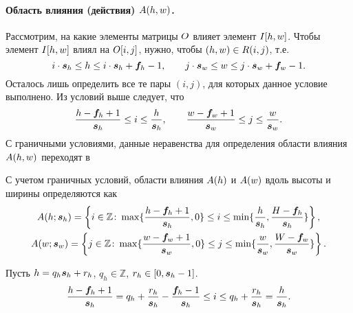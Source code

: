 \documentclass{report}
\numberwithin{theorem}{chapter}
\numberwithin{statement}{chapter}
\numberwithin{lemma}{chapter}
\theoremstyle{definition}
\numberwithin{task}{chapter}
\theoremstyle{remark}
\numberwithin{example}{chapter}
\theoremstyle{definition}
\numberwithin{definition}{chapter}
\theoremstyle{remark}
\theoremstyle{remark}
\numberwithin{lyrics}{section}
\begin{document}
\paragraph{Область влияния (действия) $A(h, w)$.}
Рассмотрим, на какие элементы матрицы $O$ влияет элемент $I[h, w]$. Чтобы элемент $I[h, w]$ влиял на $O[i, j]$, нужно, чтобы $(h, w) \in R(i, j)$, т.е.
\begin{equation}
i \cdot \boldsymbol{s}_h \le h \le i \cdot \boldsymbol{s}_h + \boldsymbol{f}_h - 1, \qquad j \cdot \boldsymbol{s}_w \le w \le j \cdot \boldsymbol{s}_w + \boldsymbol{f}_w - 1.
\end{equation}
Осталось лишь определить все те пары $(i, j)$, для которых данное условие выполнено. 
Из условий выше следует, что
\begin{equation}
\frac{h - \boldsymbol{f}_h + 1}{\boldsymbol{s}_h} \le i \le \frac{h}{\boldsymbol{s}_h}, \qquad \frac{w - \boldsymbol{f}_w + 1}{\boldsymbol{s}_w} \le j \le \frac{w}{\boldsymbol{s}_w}. 
\end{equation}
С граничными условиями, данные неравенства для определения области влияния $A(h, w)$ переходят в

С учетом граничных условий, области влияния $A(h)$ и $A(w)$ вдоль высоты и ширины определяются как
\begin{gather*}
A(h; \boldsymbol{s}_h) = \left\{i \in \mathbb{Z} \colon \max\{\frac{h - \boldsymbol{f}_h + 1}{\boldsymbol{s}_h}, 0\} \le i \le \min\{\frac{h}{\boldsymbol{s}_h}, \frac{H - \boldsymbol{f}_h}{\boldsymbol{s}_h}\}\right\},\\
A(w; \boldsymbol{s}_w) = \left\{j \in \mathbb{Z} \colon \max\{\frac{w - \boldsymbol{f}_w + 1}{\boldsymbol{s}_w}, 0\} \le j \le \min\{\frac{w}{\boldsymbol{s}_w}, \frac{W - \boldsymbol{f}_w}{\boldsymbol{s}_w}\}\right\}.\\
\end{gather*}

Пусть $h = q_h\boldsymbol{s}_h + r_h$, $q_h \in \mathbb{Z}$, $r_h \in [0, \boldsymbol{s}_h - 1]$.
\begin{equation*}
\frac{h - \boldsymbol{f}_h + 1}{\boldsymbol{s}_h} = q_h + \frac{r_h}{\boldsymbol{s}_h} -\frac{\boldsymbol{f}_h - 1}{\boldsymbol{s}_h} \le i \le q_h + \frac{r_h}{\boldsymbol{s}_h} = \frac{h}{\boldsymbol{s}_h}.
\end{equation*}
\end{document}
